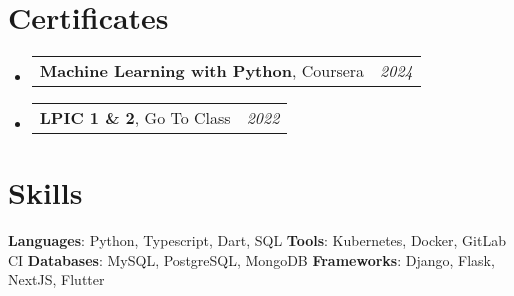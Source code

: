 \documentclass[letterpaper,11pt]{article}
\makeatletter
\newcommand{\resumeItem}[2]{
  \item\small{
    \textbf{#1}{: #2 \vspace{-2pt}}
  }
}
\newcommand{\certificateItem}[3]{
  \item\begin{tabular*}{0.97\textwidth}{l@{\extracolsep{\fill}}r}
    \small{
      \textbf{#1}{, #2 \vspace{-2pt}}
    } & \textit{\small #3} \\
  \end{tabular*}\vspace{-5pt}
}
\newcommand{\resumeSubItem}[2]{\resumeItem{#1}{#2}\vspace{-4pt}}
\newcommand{\resumeSubHeadingListStart}{\begin{itemize}[leftmargin=*]}
\newcommand{\resumeSubHeadingListEnd}{\end{itemize}}
\makeatother
\begin{document}

\section{Certificates}
  \resumeSubHeadingListStart
    \certificateItem
      {Machine Learning with Python}
      {Coursera}
      {2024}

    \certificateItem
      {LPIC 1 \& 2}
      {Go To Class}
      {2022}

  \resumeSubHeadingListEnd

%
\section{Skills}

  \textbf{Languages}{: Python, Typescript, Dart, SQL}
  \hfill
  \textbf{Tools}{: Kubernetes, Docker, GitLab CI}\vspace{2pt}
  \hfill
  \newline
  \textbf{Databases}{: MySQL, PostgreSQL, MongoDB}
  \hfill
  \textbf{Frameworks}{: Django, Flask, NextJS, Flutter}
  \hfill

\end{document}
